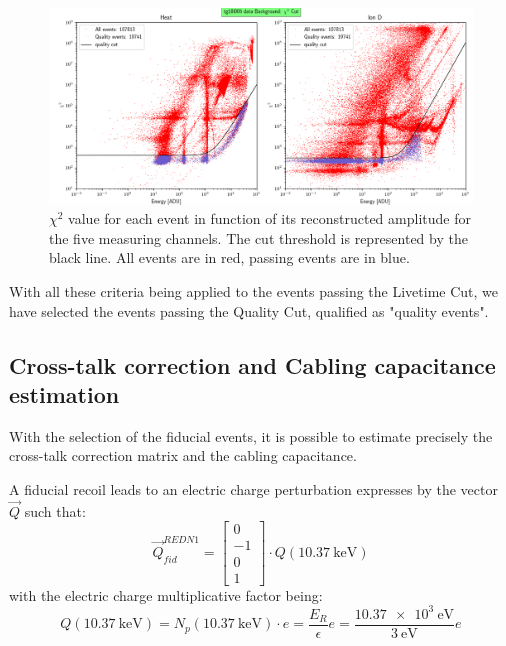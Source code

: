 \begin{figure}
\centering
\includegraphics[width=\linewidth,]{Figures/Neutron/chi2_cut.png}
\caption{$\chi^2$ value for each event in function of its reconstructed amplitude for the five measuring channels. The cut threshold is represented by the black line. All events are in red, passing events are in blue.}
\label{fig:chi2-cut}
\end{figure}

With all these criteria being applied to the events passing the Livetime Cut, we have selected the events passing the Quality Cut, qualified as "quality events".



\subsection{Cross-talk correction and Cabling capacitance estimation}

With the selection of the fiducial events, it is possible to estimate precisely the cross-talk correction matrix and the cabling capacitance.

A fiducial recoil leads to an electric charge perturbation expresses by the vector $\vec{Q}$ such that:
\begin{equation}
\vec{Q}_{fid}^{REDN1} =
\begin{bmatrix}
0 \\ -1 \\ 0 \\ 1
\end{bmatrix}
\cdot Q(\SI{10.37}{\kilo\eV})
\end{equation}
with the electric charge multiplicative factor being:
\begin{equation}
Q(\SI{10.37}{\kilo\eV})
=
N_p(\SI{10.37}{\kilo\eV}) \cdot e
=
\frac{E_R}{\epsilon} e
=
\frac{\SI{10.37e3}{\eV}}{\SI{3}{\eV}} e
\end{equation}

